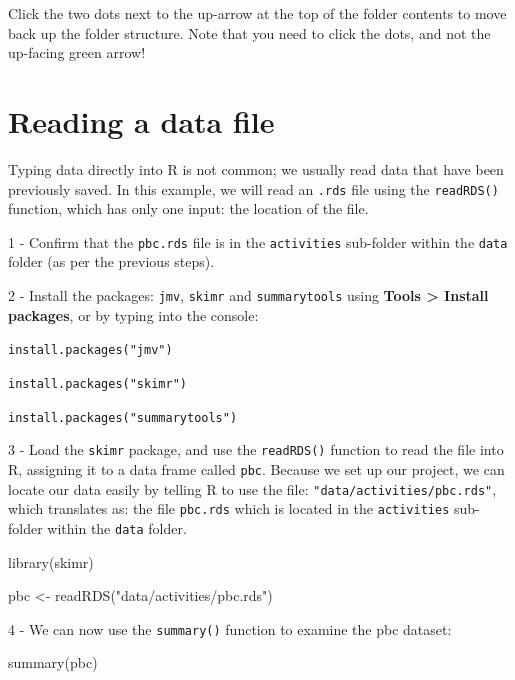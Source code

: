 \documentclass[
]{memoir}
\newenvironment{Shaded}{\begin{snugshade}}{\end{snugshade}}
\newcommand{\FunctionTok}[1]{\textcolor[rgb]{0.00,0.00,0.00}{#1}}
\newcommand{\NormalTok}[1]{#1}
\newcommand{\OtherTok}[1]{\textcolor[rgb]{0.56,0.35,0.01}{#1}}
\newcommand{\StringTok}[1]{\textcolor[rgb]{0.31,0.60,0.02}{#1}}
\begin{document}
Click the two dots next to the up-arrow at the top of the folder contents to move back up the folder structure. Note that you need to click the dots, and not the up-facing green arrow!

\hypertarget{reading-a-data-file}{%
\section{Reading a data file}\label{reading-a-data-file}}

Typing data directly into R is not common; we usually read data that have been previously saved. In this example, we will read an \texttt{.rds} file using the \texttt{readRDS()} function, which has only one input: the location of the file.

1 - Confirm that the \texttt{pbc.rds} file is in the \texttt{activities} sub-folder within the \texttt{data} folder (as per the previous steps).

2 - Install the packages: \texttt{jmv}, \texttt{skimr} and \texttt{summarytools} using \textbf{Tools \textgreater{} Install packages}, or by typing into the console:

\texttt{install.packages("jmv")}

\texttt{install.packages("skimr")}

\texttt{install.packages("summarytools")}

3 - Load the \texttt{skimr} package, and use the \texttt{readRDS()} function to read the file into R, assigning it to a data frame called \texttt{pbc}. Because we set up our project, we can locate our data easily by telling R to use the file: \texttt{"data/activities/pbc.rds"}, which translates as: the file \texttt{pbc.rds} which is located in the \texttt{activities} sub-folder within the \texttt{data} folder.

\begin{Shaded}
\begin{Highlighting}[]
\FunctionTok{library}\NormalTok{(skimr)}

\NormalTok{pbc }\OtherTok{\textless{}{-}} \FunctionTok{readRDS}\NormalTok{(}\StringTok{"data/activities/pbc.rds"}\NormalTok{)}
\end{Highlighting}
\end{Shaded}

4 - We can now use the \texttt{summary()} function to examine the pbc dataset:

\begin{Shaded}
\begin{Highlighting}[]
\FunctionTok{summary}\NormalTok{(pbc)}
\end{Highlighting}
\end{Shaded}
\end{document}
